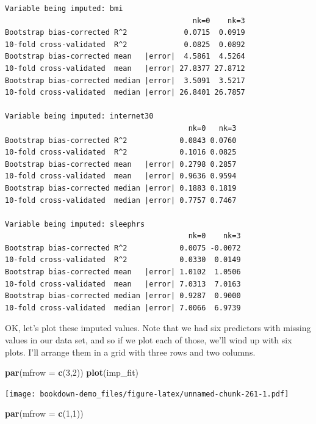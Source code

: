 \documentclass[]{book}
\newenvironment{Shaded}{\begin{snugshade}}{\end{snugshade}}
\newcommand{\KeywordTok}[1]{\textcolor[rgb]{0.13,0.29,0.53}{\textbf{#1}}}
\newcommand{\DataTypeTok}[1]{\textcolor[rgb]{0.13,0.29,0.53}{#1}}
\newcommand{\DecValTok}[1]{\textcolor[rgb]{0.00,0.00,0.81}{#1}}
\newcommand{\NormalTok}[1]{#1}
\theoremstyle{definition}
\theoremstyle{definition}
\theoremstyle{definition}
\theoremstyle{remark}
\begin{document}
\begin{verbatim}
Variable being imputed: bmi 
                                           nk=0    nk=3
Bootstrap bias-corrected R^2             0.0715  0.0919
10-fold cross-validated  R^2             0.0825  0.0892
Bootstrap bias-corrected mean   |error|  4.5861  4.5264
10-fold cross-validated  mean   |error| 27.8377 27.8712
Bootstrap bias-corrected median |error|  3.5091  3.5217
10-fold cross-validated  median |error| 26.8401 26.7857

Variable being imputed: internet30 
                                          nk=0   nk=3
Bootstrap bias-corrected R^2            0.0843 0.0760
10-fold cross-validated  R^2            0.1016 0.0825
Bootstrap bias-corrected mean   |error| 0.2798 0.2857
10-fold cross-validated  mean   |error| 0.9636 0.9594
Bootstrap bias-corrected median |error| 0.1883 0.1819
10-fold cross-validated  median |error| 0.7757 0.7467

Variable being imputed: sleephrs 
                                          nk=0    nk=3
Bootstrap bias-corrected R^2            0.0075 -0.0072
10-fold cross-validated  R^2            0.0330  0.0149
Bootstrap bias-corrected mean   |error| 1.0102  1.0506
10-fold cross-validated  mean   |error| 7.0313  7.0163
Bootstrap bias-corrected median |error| 0.9287  0.9000
10-fold cross-validated  median |error| 7.0066  6.9739
\end{verbatim}

OK, let's plot these imputed values. Note that we had six predictors
with missing values in our data set, and so if we plot each of those,
we'll wind up with six plots. I'll arrange them in a grid with three
rows and two columns.

\begin{Shaded}
\begin{Highlighting}[]
\KeywordTok{par}\NormalTok{(}\DataTypeTok{mfrow =} \KeywordTok{c}\NormalTok{(}\DecValTok{3}\NormalTok{,}\DecValTok{2}\NormalTok{))}
\KeywordTok{plot}\NormalTok{(imp_fit)}
\end{Highlighting}
\end{Shaded}

\texttt{[image: bookdown-demo\_files/figure-latex/unnamed-chunk-261-1.pdf]}

\begin{Shaded}
\begin{Highlighting}[]
\KeywordTok{par}\NormalTok{(}\DataTypeTok{mfrow =} \KeywordTok{c}\NormalTok{(}\DecValTok{1}\NormalTok{,}\DecValTok{1}\NormalTok{))}
\end{Highlighting}
\end{Shaded}
\end{document}
